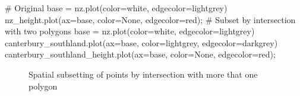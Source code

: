 \documentclass[
  letterpaper,
]{krantz}
\newenvironment{Shaded}{\begin{snugshade}}{\end{snugshade}}
\newcommand{\CommentTok}[1]{\textcolor[rgb]{0.37,0.37,0.37}{#1}}
\newcommand{\NormalTok}[1]{\textcolor[rgb]{0.00,0.23,0.31}{#1}}
\newcommand{\OperatorTok}[1]{\textcolor[rgb]{0.37,0.37,0.37}{#1}}
\newcommand{\StringTok}[1]{\textcolor[rgb]{0.13,0.47,0.30}{#1}}
\begin{document}
\begin{Shaded}
\begin{Highlighting}[]
\CommentTok{\# Original}
\NormalTok{base }\OperatorTok{=}\NormalTok{ nz.plot(color}\OperatorTok{=}\StringTok{\textquotesingle{}white\textquotesingle{}}\NormalTok{, edgecolor}\OperatorTok{=}\StringTok{\textquotesingle{}lightgrey\textquotesingle{}}\NormalTok{)}
\NormalTok{nz\_height.plot(ax}\OperatorTok{=}\NormalTok{base, color}\OperatorTok{=}\StringTok{\textquotesingle{}None\textquotesingle{}}\NormalTok{, edgecolor}\OperatorTok{=}\StringTok{\textquotesingle{}red\textquotesingle{}}\NormalTok{)}\OperatorTok{;}
\CommentTok{\# Subset by intersection with two polygons}
\NormalTok{base }\OperatorTok{=}\NormalTok{ nz.plot(color}\OperatorTok{=}\StringTok{\textquotesingle{}white\textquotesingle{}}\NormalTok{, edgecolor}\OperatorTok{=}\StringTok{\textquotesingle{}lightgrey\textquotesingle{}}\NormalTok{)}
\NormalTok{canterbury\_southland.plot(ax}\OperatorTok{=}\NormalTok{base, color}\OperatorTok{=}\StringTok{\textquotesingle{}lightgrey\textquotesingle{}}\NormalTok{, edgecolor}\OperatorTok{=}\StringTok{\textquotesingle{}darkgrey\textquotesingle{}}\NormalTok{)}
\NormalTok{canterbury\_southland\_height.plot(ax}\OperatorTok{=}\NormalTok{base, color}\OperatorTok{=}\StringTok{\textquotesingle{}None\textquotesingle{}}\NormalTok{, edgecolor}\OperatorTok{=}\StringTok{\textquotesingle{}red\textquotesingle{}}\NormalTok{)}\OperatorTok{;}
\end{Highlighting}
\end{Shaded}

\begin{figure}

\begin{minipage}{0.50\linewidth}



\end{minipage}%
%
\begin{minipage}{0.50\linewidth}



\end{minipage}%

\caption{\label{fig-spatial-subset2}Spatial subsetting of points by
intersection with more that one polygon}

\end{figure}%
\end{document}
